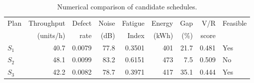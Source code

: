 \begin{table}[htbp]
\centering
\caption{Numerical comparison of candidate schedules.}
\label{tab:numerical-sim}
\small
\begin{tabular}{@{}lrrrrrrrl@{}}
\toprule
Plan & Throughput & Defect & Noise & Fatigue & Energy & Gap & V/R & Feasible \\
     & (units/h)  & rate   & (dB)  & Index   & (kWh)  & (\%) & score &         \\
\midrule
$S_{1}$ & 40.7 & 0.0079 & 77.8 & 0.3501 & 401 & 21.7 & 0.481 & Yes \\
$S_{2}$ & 48.1 & 0.0099 & 83.2 & 0.6151 & 473 & 7.5 & 0.509 & No \\
$S_{3}$ & 42.2 & 0.0082 & 78.7 & 0.3971 & 417 & 35.1 & 0.444 & Yes \\
\bottomrule
\end{tabular}
\end{table}
